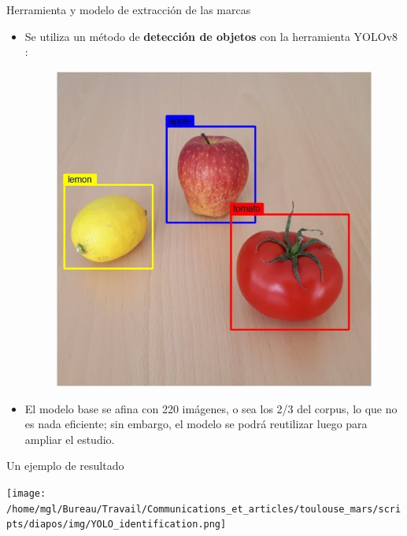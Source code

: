 \documentclass[11pt,aspectratio=169]{beamer}
\begin{document}
\begin{frame}{Herramienta y modelo de extracción de las marcas}
\begin{itemize}
\item Se utiliza un método de \textbf{detección de objetos} con la herramienta YOLOv8 \parencite{redmon_YouOnlyLook_2016}:
\begin{figure}
\begin{center}
\includegraphics[height=.4\textheight]{img/yolo_detection.png}
\end{center}
\end{figure}
\item El modelo base se afina con 220 imágenes, o sea los 2/3 del corpus, lo que no es nada eficiente; sin embargo, el modelo se podrá reutilizar luego para ampliar el estudio.
\end{itemize}
\end{frame}


\begin{frame}{Un ejemplo de resultado}
\begin{center}
\texttt{[image: /home/mgl/Bureau/Travail/Communications\_et\_articles/toulouse\_mars/scripts/diapos/img/YOLO\_identification.png]}
\end{center}
\end{frame}
\end{document}
